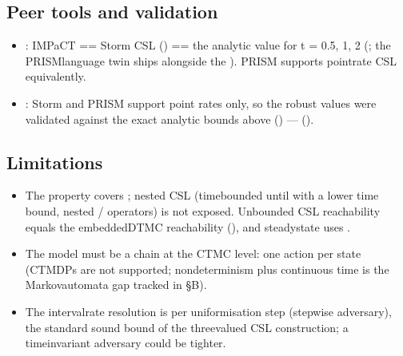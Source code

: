 \documentclass[a4paper,10pt,english]{sphinxmanual}
\begin{document}
\subsection{Peer tools and validation}
\label{\detokenize{manual/ctmc-csl:peer-tools-and-validation}}\begin{itemize}
\item {} 
\sphinxAtStartPar
{}: IMPaCT == Storm CSL () == the analytic value   for
t = 0.5, 1, 2 (; the PRISM\sphinxhyphen{}language twin  ships
alongside the ). PRISM supports point\sphinxhyphen{}rate CSL equivalently.

\item {} 
\sphinxAtStartPar
{}: Storm and PRISM support point rates only, so the robust values
were validated against the exact analytic bounds above () —
 ().

\end{itemize}


\subsection{Limitations}
\label{\detokenize{manual/ctmc-csl:limitations}}\begin{itemize}
\item {} 
\sphinxAtStartPar
The  property covers  ; nested CSL
(time\sphinxhyphen{}bounded until with a lower time bound, nested / operators) is not
exposed. Unbounded CSL reachability equals the embedded\sphinxhyphen{}DTMC reachability (),
and steady\sphinxhyphen{}state uses .

\item {} 
\sphinxAtStartPar
The model must be a chain at the CTMC level: one action per state (CTMDPs are not
supported; nondeterminism plus continuous time is the Markov\sphinxhyphen{}automata gap tracked in
 \S{}B).

\item {} 
\sphinxAtStartPar
The interval\sphinxhyphen{}rate resolution is per uniformisation step (step\sphinxhyphen{}wise adversary), the
standard sound bound of the three\sphinxhyphen{}valued CSL construction; a time\sphinxhyphen{}invariant adversary
could be tighter.

\end{itemize}
\end{document}
